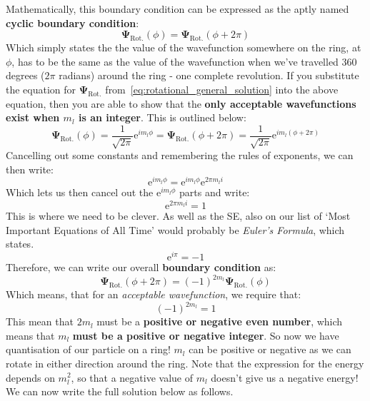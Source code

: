 \documentclass{memoir}[11pt,oneside,a4paper,openany]
\newcommand{\wf}{\ensuremath{\bm{\Psi}}\xspace}
\begin{document}
Mathematically, this boundary condition can be expressed as the aptly named \textbf{cyclic boundary condition}:
\begin{equation}
	\wf_{\text{Rot.}}(\phi) = \wf_{\text{Rot.}}(\phi + 2\pi)
\end{equation}
Which simply states the the value of the wavefunction somewhere on the ring, at $\phi$, has to be the same as the value of the wavefunction when we've travelled 360 degrees ($2\pi$ radians) around the ring - one complete revolution. If you substitute the equation for $\wf_{\text{Rot.}}$ from~\autoref{eq:rotational_general_solution} into the above equation, then you are able to show that the \textbf{only acceptable wavefunctions exist when $m_l$ is an integer}. This is outlined below:
\begin{equation}
	\wf_{\text{Rot.}}(\phi) = \frac{1}{\sqrt{2\pi}}\mathrm{e}^{im_l\phi} = \wf_{\text{Rot.}}(\phi+2\pi) = \frac{1}{\sqrt{2\pi}}\mathrm{e}^{im_l(\phi+2\pi)}
\end{equation}
Cancelling out some constants and remembering the rules of exponents, we can then write:
\begin{equation}
	\mathrm{e}^{im_l\phi} = \mathrm{e}^{im_l\phi}\mathrm{e}^{2\pi m_li}
\end{equation}
Which lets us then cancel out the $\mathrm{e}^{im_l\phi}$ parts and write:
\begin{equation}
	\mathrm{e}^{2\pi m_li} = 1
\end{equation}
This is where we need to be clever. As well as the SE, also on our list of `Most Important Equations of All Time' would probably be \emph{Euler's Formula}, which states.
\begin{equation}
	\mathrm{e}^{i\pi} = -1
\end{equation}
Therefore, we can write our overall \textbf{boundary condition} as:
\begin{equation}
	\wf_{\text{Rot.}}(\phi+2\pi) = (-1)^{2m_l}\wf_{\text{Rot.}}(\phi)
\end{equation}
Which means, that for an \emph{acceptable wavefunction}, we require that:
\begin{equation}
	(-1)^{2m_l} = 1
\end{equation}
This mean that $2m_l$ must be a \textbf{positive or negative even number}, which means that $m_l$ \textbf{must be a positive or negative integer}. So now we have quantisation of our particle on a ring! $m_l$ can be positive or negative as we can rotate in either direction around the ring. Note that the expression for the energy depends on $m_l^2$, so that a negative value of $m_l$ doesn't give us a negative energy! We can now write the full solution below as follows.  
\end{document}
